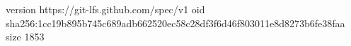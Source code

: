 version https://git-lfs.github.com/spec/v1
oid sha256:1cc19b895b745c689adb662520ec58c28df3f6d46f803011e8d8273b6fe38faa
size 1853
